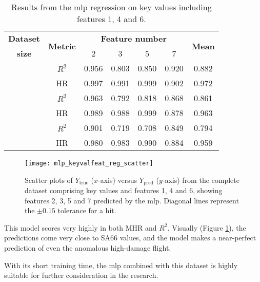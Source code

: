 \begin{table}
    \renewcommand{\arraystretch}{1.4}
    \begin{center}
        \caption{\label{tab:mlpreg:kvfs} Results from the \ac{mlp} regression on key values including features 1, 4 and 6.}
        \begin{tabular}{ >{\bfseries}c c c c c c c }
            \textbf{Dataset} & \multirow{2}{*}{\textbf{Metric}} & \multicolumn{4}{c}{\textbf{Feature number}} & \multirow{2}{*}{\textbf{Mean}} \\
            size &  & 2 & 3 & 5 & 7 \\
            \midrule
            \multirow{2}{*}{Complete}   & \(R^2\) & 0.956 & 0.803 & 0.850 & 0.920 & 0.882 \\
                                        & HR      & 0.997 & 0.991 & 0.999 & 0.902 & 0.972 \\ \cmidrule{2-7}
            \multirow{2}{*}{Reduced}    & \(R^2\) & 0.963 & 0.792 & 0.818 & 0.868 & 0.861 \\
                                        & HR      & 0.989 & 0.988 & 0.999 & 0.878 & 0.963 \\ \cmidrule{2-7}
            \multirow{2}{*}{Minimal}    & \(R^2\) & 0.901 & 0.719 & 0.708 & 0.849 & 0.794 \\
                                        & HR      & 0.980 & 0.983 & 0.990 & 0.884 & 0.959 \\
        \end{tabular}
    \end{center}
\end{table}

\begin{figure}[tb!]
    \centering
    \texttt{[image: mlp\_keyvalfeat\_reg\_scatter]}
    \caption{\label{fig:mlp_keyvalfeat_reg_scatter} Scatter plots of \(Y_\text{true}\) (\(x\)-axis) versus \(Y_\text{pred}\) (\(y\)-axis) from the complete dataset comprising key values and features 1, 4 and 6, showing features 2, 3, 5 and 7 predicted by the \ac{mlp}. Diagonal lines represent the \(\pm0.15\) tolerance for a hit.}
\end{figure}

This model scores very highly in both MHR and \(R^2\). Visually (Figure \ref{fig:mlp_keyvalfeat_reg_scatter}), the predictions come very close to SA66 values, and the model makes a near-perfect prediction of even the anomalous high-damage flight.

With its short training time, the \ac{mlp} combined with this dataset is highly suitable for further consideration in the research.

